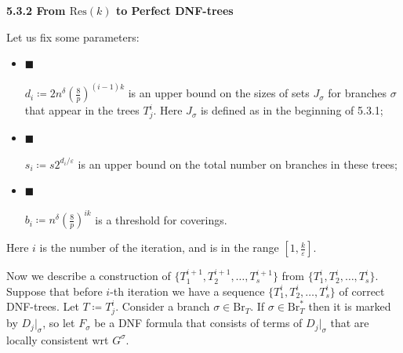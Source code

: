 \par\medskip\noindent\textbf{
5.3.2 From $\mathrm{Res}(k)$ to Perfect DNF-trees}\par




Let us fix some parameters:\par


\begin{itemize}


\item[] 
$\blacksquare$ 


$d_{i}\coloneqq 2n^{\delta}\left(\frac{8}{p}\right)^{(i-1)k}$ is an upper bound on the sizes
of sets $J_{\sigma}$ for branches $\sigma$ that appear in the trees $T^{i}_{j}$. Here $J_{\sigma}$ is
defined as in the beginning of 5.3.1;\par





\item[] 
$\blacksquare$ 


$s_{i}\coloneqq s2^{d_{i}/\varepsilon}$ is an upper bound on the total number on branches in these
trees;\par





\item[] 
$\blacksquare$ 


$b_{i}\coloneqq n^{\delta}\left(\frac{8}{p}\right)^{ik}$ is a threshold for coverings.\par





\end{itemize}




Here $i$ is the number of the iteration, and is in the range $[1,\frac{k}{\varepsilon}]$.\par




Now we describe a construction of $\{T^{i+1}_{1},T^{i+1}_{2},\dots,T^{i+1}_{s}\}$ from $\{T^{i}_{1},T^{i}_{2},\dots,T^{i}_{s}\}$. Suppose that before $i$-th iteration we have a sequence $\{T^{i}_{1},T^{i}_{2},\dots,T^{i}_{s}\}$ of correct DNF-trees. Let $T\coloneqq T^{i}_{j}$. Consider a branch $\sigma\in\mathrm{Br}_{T}$. If
$\sigma\in\mathrm{Br}^{*}_{T}$ then it is marked by $D_{j}|_{\sigma}$, so let $F_{\sigma}$ be a DNF formula that
consists of terms of $D_{j}|_{\sigma}$ that are locally consistent wrt $G^{\sigma}$.\par




